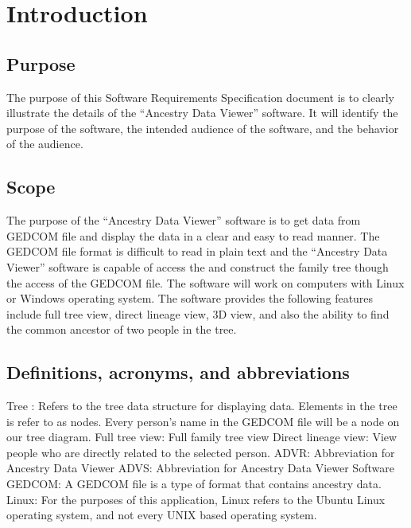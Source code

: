 \documentclass[onecolumn, draftclsnofoot, 10pt, compsoc]{IEEEtran}
\begin{document}
\section{Introduction}
\subsection{Purpose}
\begin{singlespace}
The purpose of this Software Requirements Specification document is to clearly illustrate the details of the “Ancestry Data Viewer” software. It will identify the purpose of the software, the intended audience of the software, and the behavior of the audience.
\end{singlespace}

\subsection{Scope}
\begin{singlespace}
The purpose of the “Ancestry Data Viewer” software is to get data from GEDCOM file and display the data in a clear and easy to read manner. The GEDCOM file format is difficult to read in plain text and the “Ancestry Data Viewer” software is capable of access the and construct the family tree though the access of the GEDCOM file. The software will work on computers with Linux or Windows operating system. The software provides the following features include full tree view, direct lineage view, 3D view, and also the ability to find the common ancestor of two people in the tree. 
\end{singlespace}

\subsection{Definitions, acronyms, and abbreviations}
\begin{singlespace}
Tree : Refers to the tree data structure for displaying data. Elements in the tree is refer to as nodes. Every person’s name in the GEDCOM file will be a node on our tree diagram.
Full tree view: Full family tree view
Direct lineage view: View people who are directly related to the selected person.
\newline
\newline
ADVR: Abbreviation for Ancestry Data Viewer
\newline
\newline
ADVS: Abbreviation for Ancestry Data Viewer Software
\newline
\newline
GEDCOM: A GEDCOM file is a type of format that contains ancestry data.
\newline
\newline
Linux: For the purposes of this application, Linux refers to the Ubuntu Linux operating system, and not every UNIX based operating system.

\end{singlespace}
\end{document}
